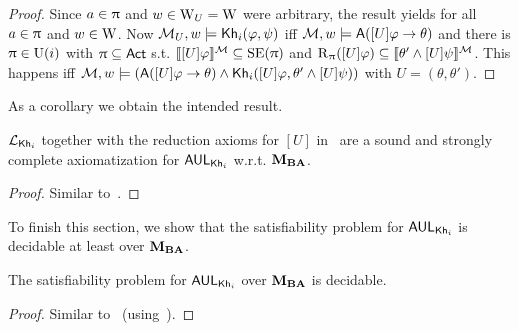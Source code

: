\begin{proof}
	Since $a \in \uppi$ and $w \in \operatorname{W}_{{U}} = \operatorname{W}$ were arbitrary, the result yields for all $a \in \uppi$ and $w \in \operatorname{W}$.
	Now $\mathcal{M}_{{U}},w \models {\sf Kh}_i(\varphi,\psi)$ iff $\mathcal{M},w \models {\sf A}([U]\varphi \rightarrow \theta)$ and there is $\uppi \in \operatorname{U}(i)$ with $\uppi \subseteq {\rm \sf Act}$ s.t. $\llbracket [U]\varphi \rrbracket^{\mathcal{M}} \subseteq \operatorname{SE}(\uppi)$ and $\operatorname{R}_\uppi([U]\varphi) \subseteq \llbracket \theta' \wedge [U]\psi \rrbracket^{\mathcal{M}}$.
	This happens iff $\mathcal{M},w \models ({\sf A}([U]\varphi \rightarrow \theta) \wedge {\sf Kh}_i([U]\varphi,\theta' \wedge [U]\psi))$ with $U = (\theta,\theta')$.
\end{proof}

As a corollary we obtain the intended result.

\medskip 

\begin{theorem}\label{th:aulcomplete}
$\mathcal{L}_{{\sf Kh}_i}$ together with the reduction axioms for $[U]$ in~ are a sound and strongly complete axiomatization for $\mathsf{AUL}_{{\sf Kh}_i}$ w.r.t. $\mathbf{M}_{\mathbf{BA}}$.
\end{theorem}

\begin{proof}
Similar to~.
\end{proof}

To finish this section, we show that the satisfiability problem for $\mathsf{AUL}_{{\sf Kh}_i}$ is decidable at least over $\mathbf{M}_{\mathbf{BA}}$.

\medskip 

\begin{corollary}\label{cor:aulsat}
The satisfiability problem for $\mathsf{AUL}_{{\sf Kh}_i}$ over $\mathbf{M}_{\mathbf{BA}}$ is decidable.
\end{corollary}
\begin{proof}
Similar to~ (using~).
\end{proof}
